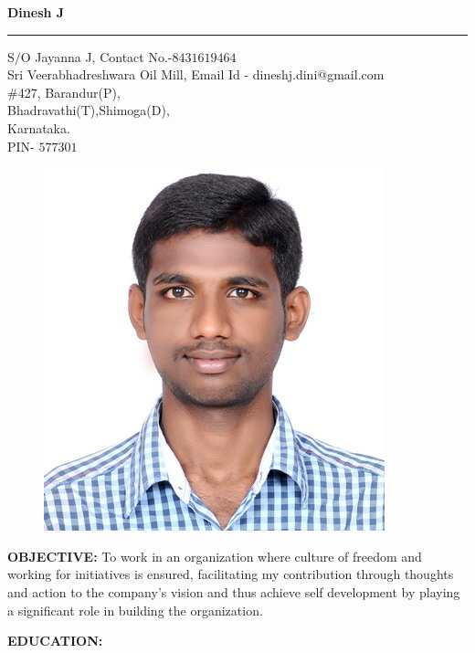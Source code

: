 \documentclass{article}
\begin{document}
\begin{center}
	\textbf{\LARGE Dinesh J}
	\rule{\textwidth}{0.5pt}
\end{center}	
S$/$O Jayanna J, \hspace{6.7cm} Contact No.-$8431619464$\\
Sri Veerabhadreshwara Oil Mill,\hspace{4.3cm}  Email Id - dineshj.dini@gmail.com\\
\#427, Barandur(P), \\Bhadravathi(T),Shimoga(D), \\  Karnataka.\\
PIN- $577301$\\
\begin{figure}[h]
	\begin{flushright}
			\includegraphics[scale=0.3]{Dinesh.jpg}
	\end{flushright}
\end{figure}
\textbf{OBJECTIVE:} \newline
To work in an organization where culture of freedom and working for initiatives is ensured, facilitating my contribution through thoughts and action to the company’s vision and thus achieve self development by playing a significant role in building the organization.
\newline

\textbf{EDUCATION:} \\ 
\end{document}
